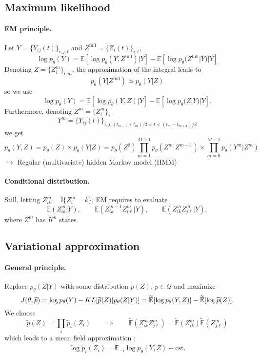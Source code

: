 \documentclass[a4paper, 12pt]{article}
\newcommand{\Esp}{\mathbb{E}}
\newcommand{\Espt}{\widetilde{\Esp}}
\newcommand{\Ibb}{\mathbb{I}}
\newcommand{\pt}{\widetilde{p}}
\newcommand{\Qcal}{\mathcal{Q}}
\newcommand{\Zf}{Z^{\text{full}}}
\newcommand{\ra}{$\rightarrow$\xspace}
\begin{document}
\subsection{Maximum likelihood}

\paragraph{EM principle.} Let $Y = \{Y_{ij}(t)\}_{i, j ,t}$ and $\Zf = \{Z_i(t)\}_{i, t}$,
$$
\log p_\theta(Y) = \Esp[\log p_\theta(Y, \Zf) | Y] - \Esp[\log p_\theta(\Zf|Y) | Y]
$$
Denoting $Z = \{Z^m_i\}_{i, m}$, the approximation of the integral leads to
$$
p_\theta(Y|\Zf) \simeq p_\theta(Y|Z)
$$
so we use
$$
\log p_\theta(Y) = \Esp[\log p_\theta(Y, Z) | Y] - \Esp[\log p_\theta(Z|Y) | Y].
$$
Furthermore, denoting $Z^m = \{Z_i^m\}_i$
$$
Y^m = \{Y_{ij}(t)\}_{i, j, (t_{m-1}+t_m)/2 < t < (t_m+t_{m+1})/2}
$$
we get
$$
p_\theta(Y, Z) 
= p_\theta(Z) \times p_\theta(Y|Z)
= p_\theta(Z^0) \prod_{m=1}^{M+1} p_\theta(Z^m|Z^{m-1}) \times \prod_{m=0}^{M+1} p_\theta(Y^m | Z^m)
$$
\ra Regular (multivariate) hidden Markov model (HMM)

\paragraph{Conditional distribution.} Still, letting $Z_{ik}^m = \Ibb\{Z_i^m = k\}$, EM requires to evaluate 
$$
\Esp(Z_{ik}^m | Y), \qquad
\Esp(Z_{ik}^{m-1} Z_{i\ell}^m | Y), \qquad
\Esp(Z_{ik}^m Z_{j\ell}^m | Y),
$$
where $Z^m$ has $K^n$ states.

\subsection{Variational approximation}

\paragraph{General principle.} Replace $p_\theta(Z|Y)$ with some distribution $\pt(Z)$, $\pt \in \Qcal$  and maximize
$$
J(\theta ,\pt) 
= \log p_\theta(Y) - KL[\pt(Z)|p_\theta(Z|Y)] \\
= \Espt[\log p_\theta(Y, Z)] - \Espt[\log \pt(Z)].
$$
We choose
$$
\pt(Z) = \prod_i \pt_i(Z_i)
\qquad \Rightarrow \qquad
\Espt(Z_{ik}^m Z_{j\ell}^m) = \Espt(Z_{ik}^m) \Espt(Z_{j\ell}^m)
$$
which leads to a mean field approximation \cite{BKM17}:
$$
\log \pt_i(Z_i) = \Espt_{- i} \log p_\theta(Y, Z) + \text{cst}.
$$
\end{document}
